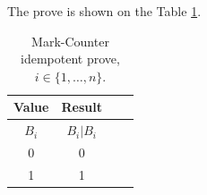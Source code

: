 \begin{itemize}
		The prove is shown on the Table \ref{tab:bit-counter_idempotent}.
		\begin{table}[!ht]
			\centering
			\begin{tabular}{|c||c|c|c|}
				\hline
				Value   & Result             \\
				\hline
				$B_{i}$ & $B_{i} | B_{i} $ \\
				\hline
				\hline
				0         & 0                     \\
				\hline
				1         & 1                     \\
				\hline
			\end{tabular}
			
			\caption{Mark-Counter idempotent prove, $i \in \{1,\dots, n\}$.}
			\label{tab:bit-counter_idempotent}
		\end{table}
\end{itemize}


